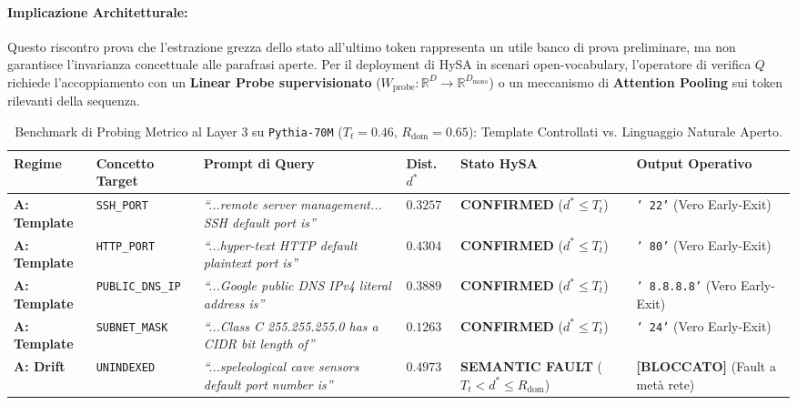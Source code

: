 \documentclass[11pt,a4paper]{article}
\theoremstyle{definition}
\begin{document}
\paragraph{Implicazione Architetturale:} Questo riscontro prova che l'estrazione grezza dello stato all'ultimo token rappresenta un utile banco di prova preliminare, ma non garantisce l'invarianza concettuale alle parafrasi aperte. Per il deployment di HySA in scenari open-vocabulary, l'operatore di verifica $Q$ richiede l'accoppiamento con un \textbf{Linear Probe supervisionato} ($W_{\mathrm{probe}}: \mathbb{R}^D \to \mathbb{R}^{D_{\mathrm{mono}}}$) o un meccanismo di \textbf{Attention Pooling} sui token rilevanti della sequenza.

\begin{table}[t]
\centering
\caption{Benchmark di Probing Metrico al Layer 3 su \texttt{Pythia-70M} ($T_t=0.46$, $R_{\mathrm{dom}}=0.65$): Template Controllati vs. Linguaggio Naturale Aperto.}
\label{tab:factual_benchmark}
\vspace{0.15cm}
\footnotesize
\setlength{\tabcolsep}{2.2pt}
\begin{tabular}{@{}p{1.8cm}p{2.3cm}p{3.8cm}p{1.0cm}p{2.6cm}p{2.7cm}@{}}
\toprule
\textbf{Regime} & \textbf{Concetto Target} & \textbf{Prompt di Query} & \textbf{Dist. $d^*$} & \textbf{Stato HySA} & \textbf{Output Operativo} \\ \midrule
\textbf{A: Template} & \texttt{SSH\_PORT} & \textit{``...remote server management... SSH default port is''} & $0.3257$ & \textbf{CONFIRMED} ($d^* \le T_t$) & \texttt{' 22'} (Vero Early-Exit) \\
\textbf{A: Template} & \texttt{HTTP\_PORT} & \textit{``...hyper-text HTTP default plaintext port is''} & $0.4304$ & \textbf{CONFIRMED} ($d^* \le T_t$) & \texttt{' 80'} (Vero Early-Exit) \\
\textbf{A: Template} & \texttt{PUBLIC\_DNS\_IP} & \textit{``...Google public DNS IPv4 literal address is''} & $0.3889$ & \textbf{CONFIRMED} ($d^* \le T_t$) & \texttt{' 8.8.8.8'} (Vero Early-Exit) \\
\textbf{A: Template} & \texttt{SUBNET\_MASK} & \textit{``...Class C 255.255.255.0 has a CIDR bit length of''} & $0.1263$ & \textbf{CONFIRMED} ($d^* \le T_t$) & \texttt{' 24'} (Vero Early-Exit) \\ \midrule
\textbf{A: Drift} & \texttt{UNINDEXED} & \textit{``...speleological cave sensors default port number is''} & $0.4973$ & \textbf{SEMANTIC FAULT} ($T_t < d^* \le R_{\mathrm{dom}}$) & \textbf{[BLOCCATO]} (Fault a metà rete) \\ \midrule

\end{tabular}
\end{table}
\end{document}
